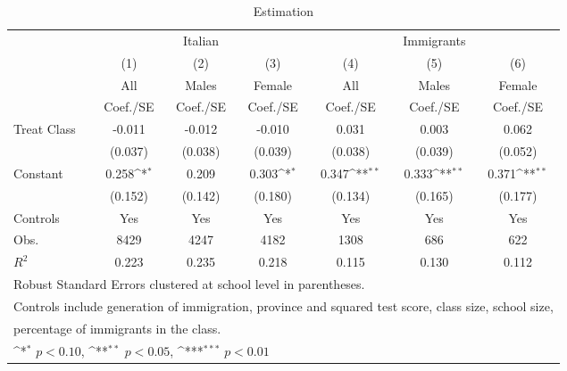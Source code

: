 \begin{table}[htbp]\centering
\def\sym#1{\ifmmode^{#1}\else\(^{#1}\)\fi}
\caption{Estimation \label{peer\_recc\_lictec2}}
\begin{tabular}{l*{6}{c}}
\toprule
                    &\multicolumn{3}{c}{Italian}                                      &\multicolumn{3}{c}{Immigrants}                                   \\\cmidrule(lr){2-4}\cmidrule(lr){5-7}
                    &\multicolumn{1}{c}{(1)}&\multicolumn{1}{c}{(2)}&\multicolumn{1}{c}{(3)}&\multicolumn{1}{c}{(4)}&\multicolumn{1}{c}{(5)}&\multicolumn{1}{c}{(6)}\\
                    &\multicolumn{1}{c}{All}&\multicolumn{1}{c}{Males}&\multicolumn{1}{c}{Female}&\multicolumn{1}{c}{All}&\multicolumn{1}{c}{Males}&\multicolumn{1}{c}{Female}\\
                    &    Coef./SE         &    Coef./SE         &    Coef./SE         &    Coef./SE         &    Coef./SE         &    Coef./SE         \\
\midrule
Treat Class         &      -0.011         &      -0.012         &      -0.010         &       0.031         &       0.003         &       0.062         \\
                    &     (0.037)         &     (0.038)         &     (0.039)         &     (0.038)         &     (0.039)         &     (0.052)         \\
Constant            &       0.258\sym{*}  &       0.209         &       0.303\sym{*}  &       0.347\sym{**} &       0.333\sym{**} &       0.371\sym{**} \\
                    &     (0.152)         &     (0.142)         &     (0.180)         &     (0.134)         &     (0.165)         &     (0.177)         \\
Controls            &         Yes         &         Yes         &         Yes         &         Yes         &         Yes         &         Yes         \\
\midrule
Obs.                &        8429         &        4247         &        4182         &        1308         &         686         &         622         \\
\(R^{2}\)           &       0.223         &       0.235         &       0.218         &       0.115         &       0.130         &       0.112         \\
\bottomrule
\multicolumn{7}{l}{\footnotesize Robust Standard Errors clustered at school level in parentheses.}\\
\multicolumn{7}{l}{\footnotesize Controls include generation of immigration, province and squared test score, class size, school size,}\\
\multicolumn{7}{l}{\footnotesize percentage of immigrants in the class.}\\
\multicolumn{7}{l}{\footnotesize \sym{*} \(p<0.10\), \sym{**} \(p<0.05\), \sym{***} \(p<0.01\)}\\
\end{tabular}
\end{table}
